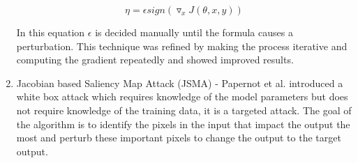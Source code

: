 \documentclass[journal,onecolumn]{IEEEtran}
\begin{document}
\begin{enumerate}
\begin{equation}
\eta = \epsilon sign(\triangledown_x J(\theta,x,y))
\end{equation}

In this equation $\epsilon$ is decided manually until the formula causes a perturbation. This technique was refined by making the process iterative and computing the gradient repeatedly and showed improved results.

\item Jacobian based Saliency Map Attack (JSMA) - Papernot et al. \cite{papernot_limitations_2015} introduced a white box attack which requires knowledge of the model parameters but does not require knowledge of the training data, it is a targeted attack. The goal of the algorithm is to identify the pixels in the input that impact the output the most and perturb these important pixels to change the output to the target output. 


\end{enumerate}
\end{document}
